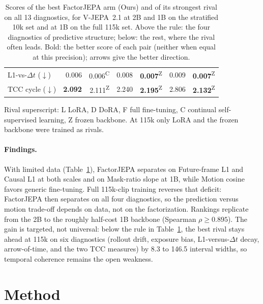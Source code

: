 \documentclass[letterpaper]{article} %
\begin{document}
\begin{table}[!t]
\begin{tabular}{lrrrrrr}
L1-vs-$\Delta t$ ($\downarrow$) & 0.006 & 0.006\textsuperscript{C} & 0.008 & \textbf{0.007}\textsuperscript{Z} & 0.009 & \textbf{0.007}\textsuperscript{Z} \\
TCC cycle ($\downarrow$) & \textbf{2.092} & 2.111\textsuperscript{Z} & 2.240 & \textbf{2.195}\textsuperscript{Z} & 2.806 & \textbf{2.132}\textsuperscript{Z} \\
\bottomrule
\end{tabular}
\par\smallskip
{\small\raggedright
Rival superscript: L LoRA, D DoRA, F full fine-tuning, C continual self-supervised learning, Z frozen backbone. At 115k only LoRA and the frozen backbone were trained as rivals.\par}
\caption{Scores of the best FactorJEPA arm (Ours) and of its strongest rival on all 13 diagnostics, for V-JEPA~2.1 at 2B and 1B on the stratified 10k set and at 1B on the full 115k set. Above the rule: the four diagnostics of predictive structure; below: the rest, where the rival often leads. Bold: the better score of each pair (neither when equal at this precision); arrows give the better direction.}
\label{tab:headline}
\end{table}

\paragraph{Findings.}
With limited data (Table~\ref{tab:headline}), FactorJEPA separates on Future-frame L1 and Causal L1 at both scales and on Mask-ratio slope at 1B, while Motion cosine favors generic fine-tuning. Full 115k-clip training reverses that deficit: FactorJEPA then separates on all four diagnostics, so the prediction versus motion trade-off depends on data, not on the factorization. Rankings replicate from the 2B to the roughly half-cost 1B backbone (Spearman $\rho \geq 0.895$). The gain is targeted, not universal: below the rule in Table~\ref{tab:headline}, the best rival stays ahead at 115k on six diagnostics (rollout drift, exposure bias, L1-versus-$\Delta t$ decay, arrow-of-time, and the two TCC measures) by 8.3 to 146.5 interval widths, so temporal coherence remains the open weakness.

\section{Method}
\end{document}
